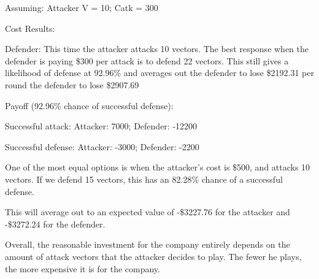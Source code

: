 \documentclass[11pt,journal]{IEEEtran}
\begin{document}
\par
Assuming: Attacker V = 10; Catk = 300\\

\par
Cost Results:\\

\par
Defender: This time the attacker attacks 10 vectors. The best response when the defender is paying \$300 per attack is to defend 22 vectors. This still gives a likelihood of defense at 92.96\% and averages out the defender to lose \$2192.31 per round the defender to lose \$2907.69\newline

\par
Payoff (92.96\% chance of successful defense): 
\par
Successful attack:
Attacker: 7000;
Defender: -12200
\par
Successful defense:
Attacker: -3000;
Defender: -2200\newline

\par
One of the most equal options is when the attacker’s cost is \$500, and attacks 10 vectors. If we defend 15 vectors, this has an 82.28\% chance of a successful defense.

\par
This will average out to an expected value of -\$3227.76 for the attacker and -\$3272.24 for the defender.

\par
Overall, the reasonable investment for the company entirely depends on the amount of attack vectors that the attacker decides to play. The fewer he plays, the more expensive it is for the company.
\end{document}
